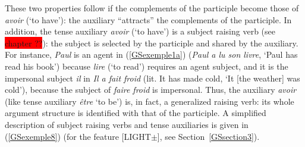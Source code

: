 \documentclass[output=paper
	        ,collection
	        ,collectionchapter
 	        ,biblatex
                ,babelshorthands
                ,newtxmath
                ,draftmode
                ,colorlinks, citecolor=brown
]{langscibook}
\begin{document}
{\eal 
	\label{GSexemple7}
	\label{GSexemple7a}
		
	\label{GSexemple7b}
		
	\label{GSexemple7c}
\zl

These two properties follow if the complements of the participle become those of \emph{avoir} (`to have'): the auxiliary ``attracts'' the complements of the participle. In addition, the tense auxiliary \emph{avoir} (`to have') is a subject raising verb (see \colorbox{red}{chapter ??}): the subject is selected by the participle and shared by the auxiliary. For instance, \emph{Paul} is an agent in (\ref{GSexemple1a}) (\emph{Paul a lu son livre}, `Paul has read his book') because \emph{lire} (`to read') requires an agent subject, and it is the impersonal subject \emph{il} in \emph{Il a fait froid} (lit. It has made cold, `It [the weather] was cold'), because the subject of \emph{faire froid} is impersonal. Thus, the auxiliary \emph{avoir} (like tense auxiliary \emph{\^etre} `to be') is, in fact, a generalized raising verb: its whole argument structure is identified with that of the participle. A simplified description of subject raising verbs and tense auxiliaries is given in (\ref{GSexemple8}) (for the feature [LIGHT$\pm$], see Section~\ref{GSsection3}).

\begin{exe}
	\ex 	\label{GSexemple8}
	\begin{xlist}
	

\end{xlist}
\end{exe}}
\end{document}
